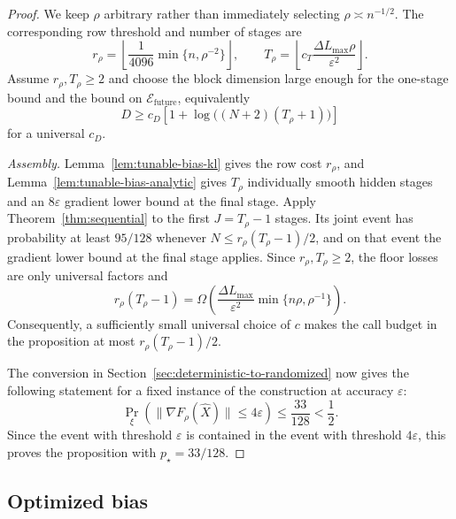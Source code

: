 \documentclass{article}
\theoremstyle{definition}
\newcommand{\cEfuture}{\mathcal{E}_{\mathrm{future}}}
\begin{document}
\begin{proof}
We keep $\rho$ arbitrary rather than immediately selecting
$\rho\asymp n^{-1/2}$.  The corresponding row threshold and number of stages are
\begin{equation}
 r_\rho=\left\lfloor\frac1{4096}
          \min\{n,\rho^{-2}\}\right\rfloor,
 \qquad
 T_\rho=\left\lfloor c_T
          \frac{\Delta L_{\max}\rho}{\varepsilon^2}\right\rfloor.
 \label{eq:restated-bias-stage-parameters}
\end{equation}
Assume $r_\rho,T_\rho\ge2$ and choose the block dimension large enough for
the one-stage bound and the bound on $\cEfuture$, equivalently
\begin{equation}
 D\ge c_D\left[1+\log\bigl((N+2)(T_\rho+1)\bigr)\right]
 \label{eq:restated-bias-dimension}
\end{equation}
for a universal $c_D$.

\emph{Assembly.}
Lemma~\ref{lem:tunable-bias-kl} gives the row cost $r_\rho$,
and Lemma~\ref{lem:tunable-bias-analytic} gives $T_\rho$ individually
smooth hidden stages and an $8\varepsilon$ gradient lower bound at the final stage.
Apply Theorem~\ref{thm:sequential} to the first $J=T_\rho-1$ stages.  Its joint event has
probability at least $95/128$ whenever
$N\le r_\rho(T_\rho-1)/2$, and on that event the gradient lower bound at the final stage
applies.
Since $r_\rho,T_\rho\ge2$, the floor losses are only
universal factors and
\begin{equation}
 r_\rho(T_\rho-1)
 =\Omega\!\left(
 \frac{\Delta L_{\max}}{\varepsilon^2}
 \min\{n\rho,\rho^{-1}\}\right).
 \label{eq:restated-bias-product}
\end{equation}
Consequently, a sufficiently small universal choice of $c$ makes the call
budget in the proposition at most $r_\rho(T_\rho-1)/2$.

The conversion in Section~\ref{sec:deterministic-to-randomized} now gives the
following statement for a fixed instance of the construction at accuracy
$\varepsilon$:
\begin{equation}
 \Pr_\xi\!\left(\|\nabla F_\rho(\widehat X)\|
                 \le4\varepsilon\right)
 \le\frac{33}{128}<\frac12.
 \label{eq:restated-bias-failure}
\end{equation}
Since the event with threshold $\varepsilon$ is contained in the event with
threshold $4\varepsilon$, this proves the proposition with $p_\star=33/128$.
\end{proof}

\subsection{Optimized bias}
\end{document}
